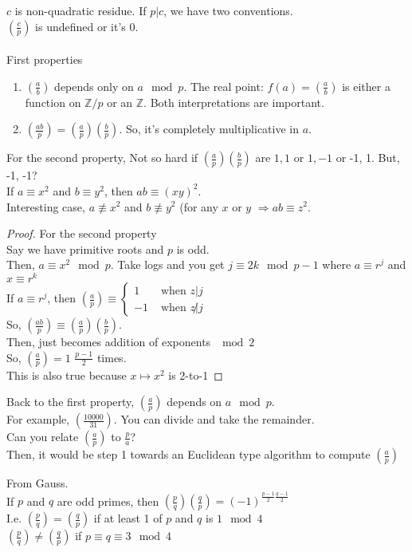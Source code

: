     $c$ is non-quadratic residue. If $p|c$, we have two conventions.\\
    $(\frac{c}{p})$ is undefined or it's 0.\\\\
    First properties
    \begin{enumerate}
      \item $(\frac{a}{b})$ depends only on $a \mod p$. The real point:
        $f(a) = (\frac{a}{b})$ is either a function on $\mathbb{Z}/p$ or an
        $\mathbb{Z}$. Both interpretations are important.
      \item $(\frac{ab}{p}) = (\frac{a}{p})(\frac{b}{p})$. So, it's completely
        multiplicative in $a$.
    \end{enumerate}
    For the second property,
      Not so hard if $(\frac{a}{p})(\frac{b}{p})$ are $1,1$ or $1, -1$ or
      -1, 1. But, -1, -1?\\
      If $a \equiv x^2$ and $b \equiv y^2$, then $ab \equiv (xy)^2$.\\
      Interesting case, $a \not\equiv x^2$ and $b \not\equiv y^2$ (for any
      $x$ or $y$ $\Rightarrow ab \equiv z^2$.
    \begin{proof} For the second property\\
      Say we have primitive roots and $p$ is odd.\\
      Then, $a \equiv x^2 \mod p$. Take logs and you get
      $j \equiv 2k \mod p-1$ where $a \equiv r^j$ and $x \equiv r^k$\\
      If $a \equiv r^j$, then $(\frac{a}{p}) \equiv \begin{cases} 1 &
      \text{ when $z|j$}\\ -1 & \text{ when $z\not|j$} \end{cases}$\\
      So, $(\frac{ab}{p}) \equiv (\frac{a}{p})(\frac{b}{p})$.\\
      Then, just becomes addition of exponents $\mod 2$\\
      So, $(\frac{a}{p}) = 1$ $\frac{p-1}{2}$ times.\\
      This is also true because $x \mapsto x^2$ is 2-to-1
    \end{proof}
    Back to the first property, $(\frac{a}{p})$ depends on $a \mod p$.\\
    For example, $(\frac{10000}{31})$. You can divide and take the remainder.\\
    Can you relate $(\frac{a}{p})$ to $\frac{p}{a}$?\\
    Then, it would be step 1 towards an Euclidean type algorithm to compute
    $(\frac{a}{p})$\\
    \begin{theorem}
      From Gauss.\\
      If $p$ and $q$ are odd primes, then $(\frac{p}{q})(\frac{q}{p}) =
      (-1)^{\frac{p-1}{2}\frac{q-1}{2}}$\\
      I.e. $(\frac{p}{q}) = (\frac{q}{p})$ if at least 1 of $p$ and $q$ is $1
        \mod 4$\\
        $(\frac{p}{q}) \not= (\frac{q}{p})$ if $p \equiv q \equiv 3 \mod 4$
    \end{theorem}
